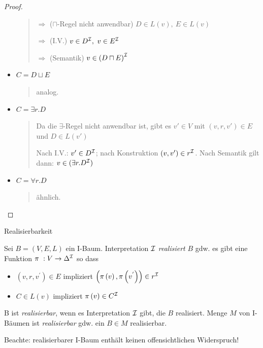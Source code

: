 \begin{proof}
\begin{itemize}
\begin{quote}
$\Rightarrow$ ($\sqcap$-Regel nicht anwendbar) $D \in L\left( v \right),\ E \in L\left( v \right)$ 

$\Rightarrow$ (I.V.) $v \in D^{\mathcal{I}},\ v \in E^{\mathcal{I}}$ 

$\Rightarrow$ (Semantik) $v \in \left( D \sqcap E \right)^{\mathcal{I}}$
\end{quote}

\item $C = D \sqcup E$

\begin{quote}
analog.
\end{quote}

\item $C = \exists r.D$

\begin{quote}
Da die $\exists$-Regel nicht anwendbar ist, gibt es $v'\in V$ mit $(v,r,v') \in E$ und $D \in L(v')$

Nach I.V.: $v' \in D^{\mathcal{I}}$; nach Konstruktion $(v,v') \in r^{\mathcal{I}}$. Nach Semantik gilt dann: $v \in (\exists r.D^{\mathcal{I}})$
\end{quote}

\item $C = \forall r.D$
\begin{quote}
ähnlich.
\end{quote}
\end{itemize}
\end{proof}

\begin{definition}{Realisierbarkeit}

Sei $B = \left( V,E,L \right)$ ein I-Baum. Interpretation $\mathcal{I}$
\emph{realisiert} $B$ gdw. es gibt eine Funktion
$\pi\ :V \rightarrow \Delta^{\mathcal{I}}$ so dass

\begin{itemize}
\item
  $\left( v,r,v^{'} \right) \in E$ impliziert
  $\left( \pi\left( v \right),\pi\left( v^{'} \right) \right) \in r^{\mathcal{I}}$
\item
  $C \in L\left( v \right)$ impliziert
  $\pi\left( v \right) \in C^{\mathcal{I}}$
\end{itemize}

B ist \emph{realisierbar}, wenn es Interpretation $\mathcal{I}$ gibt, die $B$
realisiert. Menge $M$ von I-Bäumen ist \emph{realisierbar} gdw. ein
$B \in M$ realisierbar.
\end{definition}

Beachte: realisierbarer I-Baum enthält keinen offensichtlichen Widerspruch!

